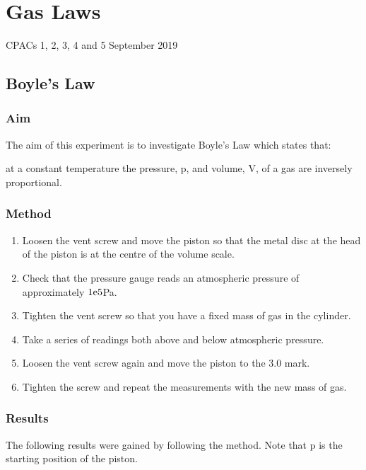 \section{Gas Laws}
CPACs 1, 2, 3, 4 and 5
\hfill
{} September 2019

\subsection{Boyle's Law}
\setcounter{equation}{0}
\subsubsection{Aim}
The aim of this experiment is to investigate Boyle's Law which states that:
\begin{quoting}
  at a constant temperature the pressure, p, and volume, V, of a gas are inversely proportional.
\end{quoting}

\subsubsection{Method}
\begin{enumerate}
  \item Loosen the vent screw and move the piston so that the metal disc at the head of the piston is at the centre of the volume scale.
  \item Check that the pressure gauge reads an atmospheric pressure of approximately ${1}\mathrm{e}{5}$Pa.
  \item Tighten the vent screw so that you have a fixed mass of gas in the cylinder.
  \item Take a series of readings both above and below atmospheric pressure.
  \item Loosen the vent screw again and move the piston to the 3.0 mark.
  \item Tighten the screw and repeat the measurements with the new mass of gas.
\end{enumerate}

\subsubsection{Results}
The following results were gained by following the method.
Note that p is the starting position of the piston.


